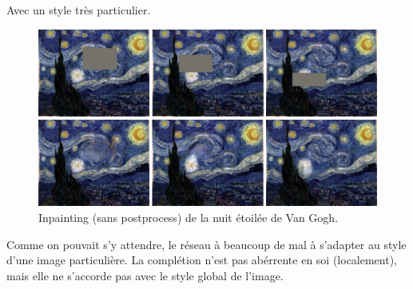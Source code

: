 \documentclass[12pt]{article}
\begin{document}
Avec un style très particulier.

\begin{figure}[H]
    \includegraphics[width=1.0\textwidth]{Images/gogh.png}
    \caption{Inpainting (sans postprocess) de la nuit étoilée de Van Gogh.}
\end{figure}

Comme on pouvait s'y attendre, le réseau à beaucoup de mal à s'adapter au style d'une image particulière. La complétion n'est pas abérrente en soi (localement), mais elle ne s'accorde pas avec le style global de l'image.



\end{document}
